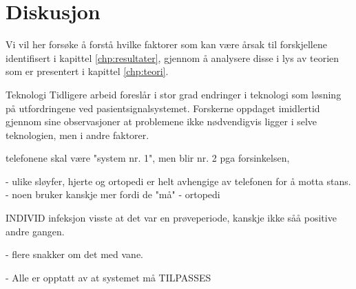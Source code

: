 \chapter{Diskusjon}
\label{chp:diskusjon}

Vi vil her forsøke å forstå hvilke faktorer som kan være årsak til forskjellene identifisert i kapittel \ref{chp:resultater}, gjennom å analysere disse i lys av teorien som er presentert i kapittel \ref{chp:teori}. 



Teknologi
Tidligere arbeid foreslår i stor grad endringer i teknologi som løsning på utfordringene ved pasientsignalsystemet. Forskerne oppdaget imidlertid gjennom sine observasjoner at problemene ikke nødvendigvis ligger i selve teknologien, men i andre faktorer.

 telefonene skal være "system nr. 1", men blir nr. 2 pga forsinkelsen,
 
 
 - ulike sløyfer, hjerte og ortopedi er helt avhengige av telefonen for å motta stans.	
	- noen bruker kanskje mer fordi de "må" - ortopedi
	
	
	
INDIVID
infeksjon visste at det var en prøveperiode, kanskje ikke såå positive andre gangen.

- flere snakker om det med vane.

- Alle er opptatt av at systemet må TILPASSES